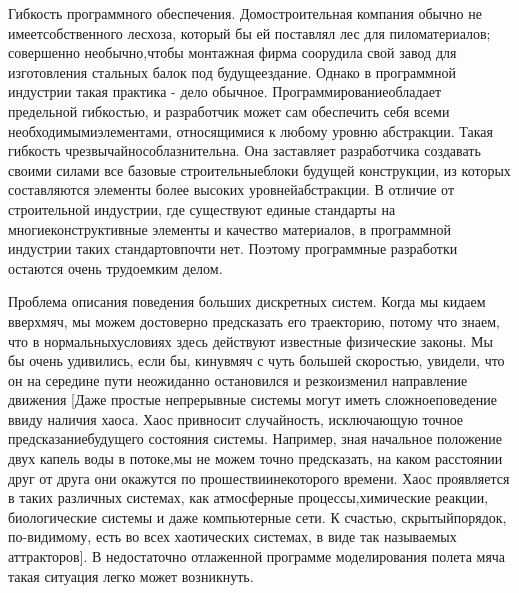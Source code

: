\documentclass[10pt]{article}
\begin{document}
Гибкость программного обеспечения. Домостроительная компания обычно не имеет\linebreak  собственного лесхоза, который бы ей поставлял лес для пиломатериалов; совершенно необычно,\linebreak  чтобы монтажная фирма соорудила свой завод для изготовления стальных балок под будущее\linebreak здание. Однако в программной индустрии такая практика - дело обычное. Программирование\linebreak обладает предельной гибкостью, и разработчик может сам обеспечить себя всеми необходимыми\linebreak элементами, относящимися к любому уровню абстракции. Такая гибкость чрезвычайно\linebreak соблазнительна. Она заставляет разработчика создавать своими силами все базовые строительные\linebreak блоки будущей конструкции, из которых составляются элементы более высоких уровней\linebreak абстракции. В отличие от строительной индустрии, где существуют единые стандарты на многие\linebreak конструктивные элементы и качество материалов, в программной индустрии таких стандартов\linebreak почти нет. Поэтому программные разработки остаются очень трудоемким делом.
 
Проблема описания поведения больших дискретных систем. Когда мы кидаем вверх\linebreak мяч, мы можем достоверно предсказать его траекторию, потому что знаем, что в нормальных\linebreak условиях здесь действуют известные физические законы. Мы бы очень удивились, если бы, кинув\linebreak мяч с чуть большей скоростью, увидели, что он на середине пути неожиданно остановился и резко\linebreak изменил направление движения [Даже простые непрерывные системы могут иметь сложное\linebreak поведение ввиду наличия хаоса. Хаос привносит случайность, исключающую точное предсказание\linebreak будущего состояния системы. Например, зная начальное положение двух капель воды в потоке,\linebreak мы не можем точно предсказать, на каком расстоянии друг от друга они окажутся по прошествии\linebreak некоторого времени. Хаос проявляется в таких различных системах, как атмосферные процессы,\linebreak химические реакции, биологические системы и даже компьютерные сети. К счастью, скрытый\linebreak порядок, по-видимому, есть во всех хаотических системах, в виде так называемых аттракторов]\linebreak. В недостаточно отлаженной программе моделирования полета мяча такая ситуация легко может возникнуть. 
\end{document}
